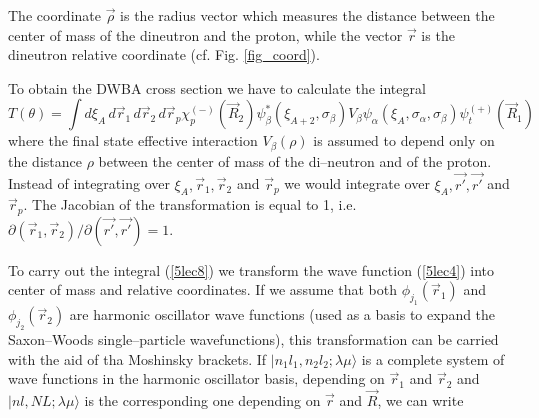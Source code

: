 \begin{subappendices}
The coordinate $\vec \rho$ is the radius vector which measures the distance between the center of mass of the dineutron and the proton, while the vector $\vec r$ is the dineutron relative coordinate (cf. Fig. \ref{fig_coord}).


To obtain the DWBA cross section we have to calculate the integral
\begin{equation}\label{5lec8}
T(\theta)=\int d\xi_A \,d\vec r_1 \,d\vec r_2 \,d\vec r_p \chi^{(-)}_p(\vec R_2) \psi^*_\beta(\xi_{A+2},\sigma_\beta) V_\beta \psi_\alpha(\xi_{A},\sigma_\alpha,\sigma_\beta)\psi_t^{(+)}(\vec R_1)
\end{equation}
where the final state effective interaction $V_\beta(\rho)$ is assumed to depend only on the distance $\rho$ between the center of mass of the di--neutron and of the proton. 
Instead of integrating over $\xi_{A},\vec r_1,\vec r_2$ and $\vec r_p$ we would integrate over $\xi_{A},\vec {r'},\vec {r'}$ and $\vec r_p$. The Jacobian of the transformation is equal to 1, i.e. $\partial (\vec r_1,\vec r_2)/\partial (\vec {r'},\vec {r'})=1$.


To carry out the integral (\ref{5lec8}) we transform the wave function (\ref{5lec4}) into center of mass and relative coordinates. If we assume that both $\phi_{j_1}(\vec r_1)$ and $\phi_{j_2}(\vec r_2)$ are harmonic oscillator wave functions (used as a basis to expand the Saxon--Woods single--particle wavefunctions), this transformation can be carried with the aid of tha Moshinsky brackets. If $| n_1 l_1,n_2 l_2; \lambda \mu \rangle$ is a complete system of wave functions in the harmonic oscillator basis, depending on $\vec r_1$ and $\vec r_2$ and $| n l,N L; \lambda \mu \rangle$ is the corresponding one depending on $\vec r$ and  $\vec R$, we can write


\end{subappendices}
